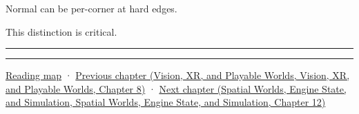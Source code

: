 Normal can be per-corner at hard edges.

This distinction is critical.

\begin{center}\rule{0.5\linewidth}{0.5pt}\end{center}

\begin{center}\rule{0.5\linewidth}{0.5pt}\end{center}

\hyperref[volume-reading-map]{Reading map} · \href{../07-Vision-XR-and-Playable-Worlds/main.pdf\#nameddest=04-visual-computing-ii-ch039-tiling-ordering-and-compositing-at-scale}{Previous chapter (Vision, XR, and Playable Worlds, Vision, XR, and Playable Worlds, Chapter 8)} · \href{../05-Spatial-Worlds-Engine-State-and-Simulation/main.pdf\#nameddest=04-visual-computing-ii-ch041-per-vertex-and-per-corner-mesh-attributes}{Next chapter (Spatial Worlds, Engine State, and Simulation, Spatial Worlds, Engine State, and Simulation, Chapter 12)}
